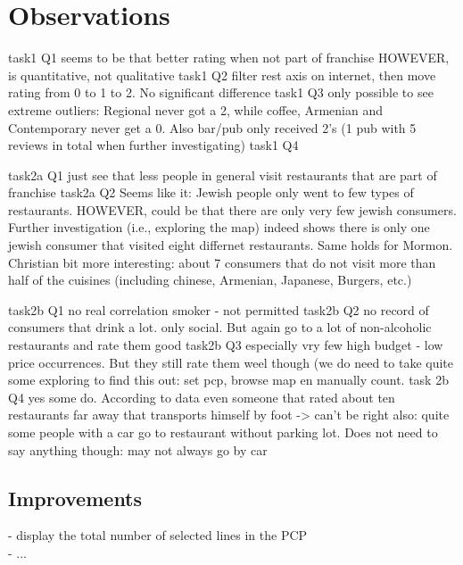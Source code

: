 \section{Observations}\label{sec:observations}




task1 Q1
seems to be that better rating when not part of franchise
HOWEVER, is quantitative, not qualitative
task1 Q2
filter rest axis on internet, then move rating from 0 to 1 to 2. No significant difference
task1 Q3
only possible to see extreme outliers: Regional never got a 2, while coffee, Armenian and Contemporary never get a 0. Also bar/pub only received 2's (1 pub with 5 reviews in total when further investigating)
task1 Q4


task2a Q1
just see that less people in general visit restaurants that are part of franchise
task2a Q2
Seems like it: Jewish people only went to few types of restaurants. HOWEVER, could be that there are only very few jewish consumers. Further investigation (i.e., exploring the map) indeed shows there is only one jewish consumer that visited eight differnet restaurants. Same holds for Mormon. Christian bit more interesting: about 7 consumers that do not visit more than half of the cuisines (including chinese, Armenian, Japanese, Burgers, etc.)


task2b Q1
no real correlation smoker - not permitted
task2b Q2
no record of consumers that drink a lot. only social. But again go to a lot of non-alcoholic restaurants and rate them good
task2b Q3
especially vry few high budget - low price occurrences. But they still rate them weel though (we do need to take quite some exploring to find this out: set pcp, browse map en manually count.
task 2b Q4
yes some do. According to data even someone that rated about ten restaurants far away that transports himself by foot -> can't be right
also: quite some people with a car go to restaurant without parking lot. Does not need to say anything though: may not always go by car



\subsection{Improvements}\label{sec:improvements}
- display the total number of selected lines in the PCP
\\- ...







